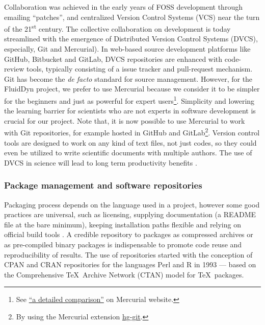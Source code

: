 Collaboration was achieved in the early years of FOSS development through
emailing ``patches'', and centralized Version Control Systems (VCS) near the
turn of the 21\textsuperscript{st} century.  The collective collaboration on
development is today streamlined with the emergence of Distributed Version
Control Systems (DVCS), especially, Git and Mercurial). In web-based source
development platforms like GitHub, Bitbucket and GitLab, DVCS repositories are
enhanced with code-review tools, typically consisting of a issue tracker
and pull-request mechanism.
%
Git has become the \textit{de facto} standard for source management. However,
for the FluidDyn project, we prefer to use Mercurial because we consider it to
be simpler for the beginners and just as powerful for expert users\footnote{See
  \href{https://www.mercurial-scm.org/wiki/GitConcepts}{``a detailed
comparison''} on Mercurial website.}. Simplicity and lowering the learning
barrier for scientists who are not experts in software development is crucial
for our project.
%
Note that, it is now possible to use Mercurial to work with Git repositories,
for example hosted in GitHub and GitLab\footnote{By using the Mercurial
extension \href{http://hg-git.github.io/}{hg-git}.}.
%
Version control tools are designed to work on any kind of text files, not just
codes, so they could even be utilized to write scientific documents with
multiple authors.
%
The use of DVCS in science will lead to long term productivity benefits
\citep{wilson_best_2014}.


\subsubsection{Package management and software repositories} 

Packaging process depends on the language used in a project, however some good
practices are universal, such as licensing, supplying documentation (a README
file at the bare minimum), keeping installation paths flexible and relying on
official build tools \citep{taschuk_ten_2017}.
%
A credible repository to packages as compressed archives or as pre-compiled binary
packages is indispensable to promote code reuse and reproducibility of results.
%
The use of repositories started with the conception of
CPAN and CRAN repositories for the languages Perl and R in 1993 --- based on
the Comprehensive \TeX\ Archive Network (CTAN) model for \TeX\ packages. 

